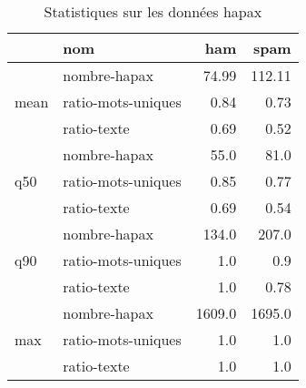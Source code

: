 \begin{table}[H]
\centering
\caption{Statistiques sur les données hapax}
\label{tab:f_hapax}
\begin{tabular}{ll|rr}
\toprule
 & nom & ham & spam \\
\midrule
\multirow[c]{3}{*}{mean} & nombre-hapax & 74.99 & 112.11 \\
 & ratio-mots-uniques & 0.84 & 0.73 \\
 & ratio-texte & 0.69 & 0.52 \\
\cline{1-4}
\multirow[c]{3}{*}{q50} & nombre-hapax & 55.0 & 81.0 \\
 & ratio-mots-uniques & 0.85 & 0.77 \\
 & ratio-texte & 0.69 & 0.54 \\
\cline{1-4}
\multirow[c]{3}{*}{q90} & nombre-hapax & 134.0 & 207.0 \\
 & ratio-mots-uniques & 1.0 & 0.9 \\
 & ratio-texte & 1.0 & 0.78 \\
\cline{1-4}
\multirow[c]{3}{*}{max} & nombre-hapax & 1609.0 & 1695.0 \\
 & ratio-mots-uniques & 1.0 & 1.0 \\
 & ratio-texte & 1.0 & 1.0 \\
\cline{1-4}
\bottomrule
\end{tabular}
\end{table}
